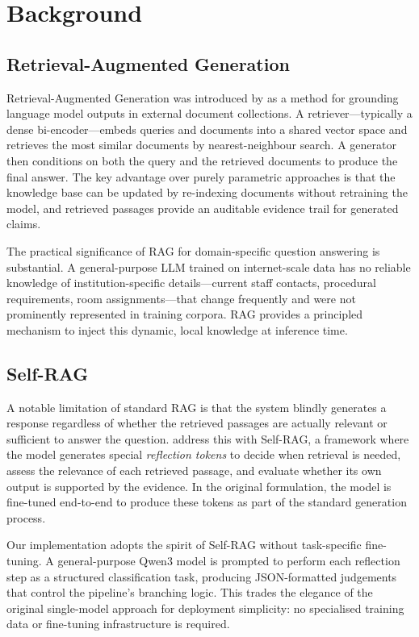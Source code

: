 \chapter{Background}

\section{Retrieval-Augmented Generation}

Retrieval-Augmented Generation was introduced by \textcite{rag2020} as a method for grounding language model outputs in external document collections. A retriever---typically a dense bi-encoder---embeds queries and documents into a shared vector space and retrieves the most similar documents by nearest-neighbour search. A generator then conditions on both the query and the retrieved documents to produce the final answer. The key advantage over purely parametric approaches is that the knowledge base can be updated by re-indexing documents without retraining the model, and retrieved passages provide an auditable evidence trail for generated claims.

The practical significance of RAG for domain-specific question answering is substantial. A general-purpose LLM trained on internet-scale data has no reliable knowledge of institution-specific details---current staff contacts, procedural requirements, room assignments---that change frequently and were not prominently represented in training corpora. RAG provides a principled mechanism to inject this dynamic, local knowledge at inference time.

\section{Self-RAG}

A notable limitation of standard RAG is that the system blindly generates a response regardless of whether the retrieved passages are actually relevant or sufficient to answer the question. \textcite{selfrag2024} address this with Self-RAG, a framework where the model generates special \emph{reflection tokens} to decide when retrieval is needed, assess the relevance of each retrieved passage, and evaluate whether its own output is supported by the evidence. In the original formulation, the model is fine-tuned end-to-end to produce these tokens as part of the standard generation process.

Our implementation adopts the spirit of Self-RAG without task-specific fine-tuning. A general-purpose Qwen3 model is prompted to perform each reflection step as a structured classification task, producing JSON-formatted judgements that control the pipeline's branching logic. This trades the elegance of the original single-model approach for deployment simplicity: no specialised training data or fine-tuning infrastructure is required.

